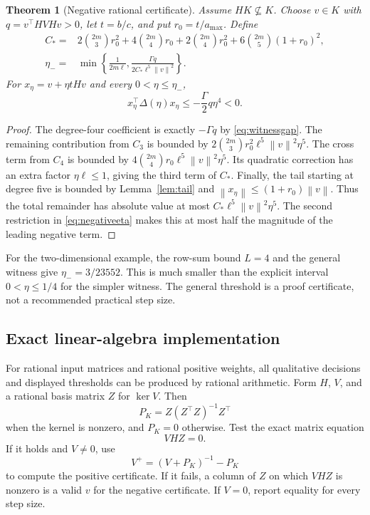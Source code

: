 \documentclass[11pt,letterpaper]{article}
\numberwithin{equation}{section}
\newtheorem{theorem}{Theorem}[section]
\theoremstyle{definition}
\newcommand{\norm}[1]{\left\lVert #1\right\rVert}
\begin{document}
\begin{theorem}[Negative rational certificate]\label{thm:negativecert}
Assume $HK\not\subseteq K$. Choose $v\in K$ with $q=v^\top HVHv>0$, let $t=b/c$, and put $r_0=t/a_{\max}$. Define
\begin{align}
 C_*={}&2\binom{2m}{3}r_0^2+4\binom{2m}{4}r_0
        +2\binom{2m}{4}r_0^2
        +6\binom{2m}{5}(1+r_0)^2,\label{eq:remainderconstant}\\
 \eta_-={}&\min\left\{\frac1{2m\ell},
 \frac{\Gamma q}{2C_*\ell^5\norm v^2}\right\}.\label{eq:negativeeta}
\end{align}
For $x_\eta=v+\eta tHv$ and every $0<\eta\le\eta_-$,
\[
 x_\eta^\top\Delta(\eta)x_\eta\le-\frac{\Gamma}{2}q\eta^4<0.
\]
\end{theorem}
\begin{proof}
The degree-four coefficient is exactly $-\Gamma q$ by \eqref{eq:witnessgap}. The remaining contribution from $C_3$ is bounded by
$2\binom{2m}{3}r_0^2\ell^5\norm v^2\eta^5$.
The cross term from $C_4$ is bounded by
$4\binom{2m}{4}r_0\ell^5\norm v^2\eta^5$.
Its quadratic correction has an extra factor $\eta\ell\le1$, giving the third term of $C_*$. Finally, the tail starting at degree five is bounded by Lemma~\ref{lem:tail} and
$\norm{x_\eta}\le(1+r_0)\norm v$.
Thus the total remainder has absolute value at most
$C_*\ell^5\norm v^2\eta^5$.
The second restriction in \eqref{eq:negativeeta} makes this at most half the magnitude of the leading negative term.
\end{proof}

For the two-dimensional example, the row-sum bound $L=4$ and the general witness give $\eta_-=3/23552$. This is much smaller than the explicit interval $0<\eta\le1/4$ for the simpler witness. The general threshold is a proof certificate, not a recommended practical step size.

\subsection{Exact linear-algebra implementation}

For rational input matrices and rational positive weights, all qualitative decisions and displayed thresholds can be produced by rational arithmetic. Form $H$, $V$, and a rational basis matrix $Z$ for $\ker V$. Then
\[
 P_K=Z(Z^\top Z)^{-1}Z^\top
\]
when the kernel is nonzero, and $P_K=0$ otherwise. Test the exact matrix equation
\begin{equation}\label{eq:diagnostic}
 VHZ=0.
\end{equation}
If it holds and $V\ne0$, use
\[
 V^+=(V+P_K)^{-1}-P_K
\]
to compute the positive certificate. If it fails, a column of $Z$ on which $VHZ$ is nonzero is a valid $v$ for the negative certificate. If $V=0$, report equality for every step size.
\end{document}
